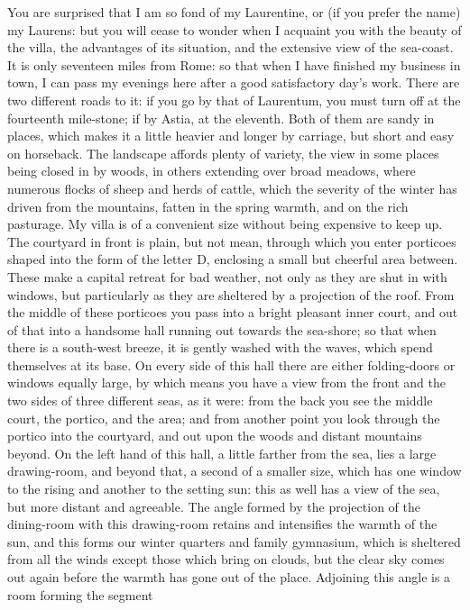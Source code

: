 You are surprised that I am so fond of my Laurentine, or (if you prefer
the name) my Laurens: but you will cease to wonder when I acquaint you
with the beauty of the villa, the advantages of its situation, and the
extensive view of the sea-coast. It is only seventeen miles from Rome: so
that when I have finished my business in town, I can pass my evenings here
after a good satisfactory day's work. There are two different roads to it:
if you go by that of Laurentum, you must turn off at the fourteenth
mile-stone; if by Astia, at the eleventh. Both of them are sandy in
places, which makes it a little heavier and longer by carriage, but short
and easy on horseback. The landscape affords plenty of variety, the view
in some places being closed in by woods, in others extending over broad
meadows, where numerous flocks of sheep and herds of cattle, which the
severity of the winter has driven from the mountains, fatten in the spring
warmth, and on the rich pasturage. My villa is of a convenient size
without being expensive to keep up. The courtyard in front is plain, but
not mean, through which you enter porticoes shaped into the form of the
letter D, enclosing a small but cheerful area between. These make a
capital retreat for bad weather, not only as they are shut in with
windows, but particularly as they are sheltered by a projection of the
roof. From the middle of these porticoes you pass into a bright pleasant
inner court, and out of that into a handsome hall running out towards the
sea-shore; so that when there is a south-west breeze, it is gently washed
with the waves, which spend themselves at its base. On every side of this
hall there are either folding-doors or windows equally large, by which
means you have a view from the front and the two sides of three different
seas, as it were: from the back you see the middle court, the portico, and
the area; and from another point you look through the portico into the
courtyard, and out upon the woods and distant mountains beyond. On the
left hand of this hall, a little farther from the sea, lies a large
drawing-room, and beyond that, a second of a smaller size, which has one
window to the rising and another to the setting sun: this as well has a
view of the sea, but more distant and agreeable. The angle formed by the
projection of the dining-room with this drawing-room retains and
intensifies the warmth of the sun, and this forms our winter quarters and
family gymnasium, which is sheltered from all the winds except those which
bring on clouds, but the clear sky comes out again before the warmth has
gone out of the place. Adjoining this angle is a room forming the segment

